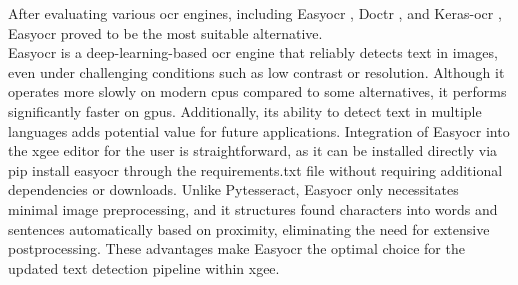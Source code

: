 After evaluating various \acrshort{ocr} engines, including Easy\acrshort{ocr} \cite{easyocr_2024}, Doctr \cite{doctr_2024}, and Keras-\acrshort{ocr} \cite{keras_ocr_2023}, Easy\acrshort{ocr} proved to be the most suitable alternative.\\
Easy\acrshort{ocr} is a deep-learning-based \acrshort{ocr} engine that reliably detects text in images, even under challenging conditions such as low contrast or resolution. Although it operates more slowly on modern \acrshort{cpu}s compared to some alternatives, it performs significantly faster on \acrshort{gpu}s. Additionally, its ability to detect text in multiple languages adds potential value for future applications. Integration of Easy\acrshort{ocr} into the \acrshort{xgee} editor for the user is straightforward, as it can be installed directly via pip install easy\acrshort{ocr} through the requirements.txt file without requiring additional dependencies or downloads. Unlike Pytesseract, Easy\acrshort{ocr} only necessitates minimal image preprocessing, and it structures found characters into words and sentences automatically based on proximity, eliminating the need for extensive postprocessing. These advantages make Easy\acrshort{ocr} the optimal choice for the updated text detection pipeline within \acrshort{xgee}.


